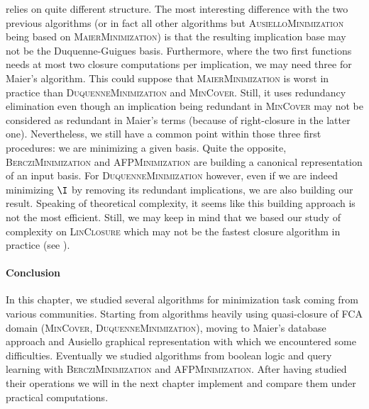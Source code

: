 relies on quite different structure. The most interesting difference with the two previous algorithms (or in fact all other algorithms but \textsc{AusielloMinimization} being based on \textsc{MaierMinimization}) is that the resulting implication base may not be the Duquenne-Guigues basis. Furthermore, where the two first functions needs at most two closure computations per implication, we may need three for Maier's algorithm. This could suppose that \textsc{MaierMinimization} is worst in practice than \textsc{DuquenneMinimization} and \textsc{MinCover}. Still, it uses redundancy elimination even though an implication being redundant in \textsc{MinCover} may not be considered as redundant in Maier's terms (because of right-closure in the latter one). Nevertheless, we still have a common point within those three first procedures: we are minimizing a given basis. Quite the opposite, \textsc{BercziMinimization} and \textsc{AFPMinimization} are building a canonical representation of an input basis. For \textsc{DuquenneMinimization} however, even if we are indeed minimizing $\I$ by removing its redundant implications, we are also building our result. Speaking of theoretical complexity, it seems like this building approach is not the most efficient. Still, we may keep in mind that we based our study of complexity on \textsc{LinClosure} which may not be the fastest closure algorithm in practice (see \cite{bazhanov_optimizations_2014}). 


\paragraph{Conclusion} In this chapter, we studied several algorithms for 
minimization task coming from various communities. Starting from algorithms
heavily using quasi-closure of FCA domain (\textsc{MinCover}, \textsc{DuquenneMinimization}), moving to Maier's database approach and Ausiello graphical representation with which we encountered some difficulties. Eventually we studied algorithms from boolean logic and query learning with \textsc{BercziMinimization} and \textsc{AFPMinimization}. After having studied their operations we will in the next chapter implement and compare them under practical computations.



